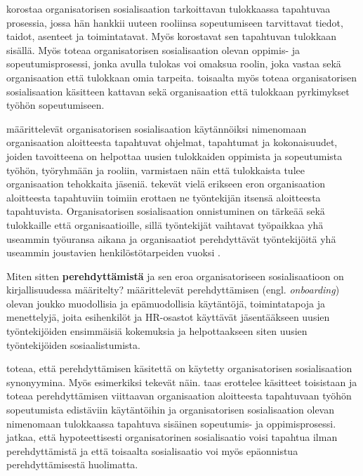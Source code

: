 \documentclass[utf8]{gradu3}
\begin{document}
\textcite{wanberg-2012} korostaa organisatorisen sosialisaation tarkoittavan tulokkaassa tapahtuvaa prosessia, jossa hän hankkii uuteen rooliinsa sopeutumiseen tarvittavat tiedot, taidot, asenteet ja toimintatavat. Myös \textcite{klein-polin-2012} korostavat sen tapahtuvan tulokkaan sisällä. Myös \textcite{chao-2012} toteaa organisatorisen sosialisaation olevan oppimis- ja sopeutumisprosessi, jonka avulla tulokas voi omaksua roolin, joka vastaa sekä organisaation että tulokkaan omia tarpeita. \textcite{chao-2012} toisaalta myös toteaa organisatorisen sosialisaation käsitteen kattavan sekä organisaation että tulokkaan pyrkimykset työhön sopeutumiseen.

\textcite{saks-gruman-2012} määrittelevät organisatorisen sosialisaation käytännöiksi nimenomaan organisaation aloitteesta tapahtuvat ohjelmat, tapahtumat ja kokonaisuudet, joiden tavoitteena on helpottaa uusien tulokkaiden oppimista ja sopeutumista työhön, työryhmään ja rooliin, varmistaen näin että tulokkaista tulee organisaation tehokkaita jäseniä. \textcite{saks-gruman-2012} tekevät vielä erikseen eron organisaation aloitteesta tapahtuviin toimiin erottaen ne työntekijän itsensä aloitteesta tapahtuvista. Organisatorisen sosialisaation onnistuminen on tärkeää sekä tulokkaille että organisaatioille, sillä työntekijät vaihtavat työpaikkaa yhä useammin työuransa aikana ja organisaatiot perehdyttävät työntekijöitä yhä useammin joustavien henkilöstötarpeiden vuoksi \parencite{bauer-ym-2007}.

Miten sitten \textbf{perehdyttämistä} ja sen eroa organisatoriseen sosialisaatioon on kirjallisuudessa määritelty? \textcite{klein-polin-2012} määrittelevät perehdyttämisen (engl. \textit{onboarding}) olevan joukko muodollisia ja epämuodollisia käytäntöjä, toimintatapoja ja menettelyjä, joita esihenkilöt ja HR-osastot käyttävät jäsentääkseen uusien työntekijöiden ensimmäisiä kokemuksia ja helpottaakseen siten uusien työntekijöiden sosiaalistumista.

\textcite{chao-2012} toteaa, että perehdyttämisen käsitettä on käytetty organisatorisen sosialisaation synonyymina. Myös esimerkiksi \textcite{bauer-ym-2007} tekevät näin. \textcite{wanberg-2012} taas erottelee käsitteet toisistaan ja toteaa perehdyttämisen viittaavan organisaation aloitteesta tapahtuvaan työhön sopeutumista edistäviin käytäntöihin ja organisatorisen sosialisaation olevan nimenomaan tulokkaassa tapahtuva sisäinen sopeutumis- ja oppimisprosessi. \textcite{wanberg-2012} jatkaa, että hypoteettisesti organisatorinen sosialisaatio voisi tapahtua ilman perehdyttämistä ja että toisaalta sosialisaatio voi myös epäonnistua perehdyttämisestä huolimatta.
\end{document}
